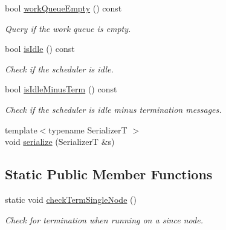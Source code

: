 \begin{DoxyCompactItemize}
bool \hyperlink{structvt_1_1sched_1_1_scheduler_a49bfd7d4a6d187c6c995b84885a1ed19}{work\+Queue\+Empty} () const
\begin{DoxyCompactList}\small\item\em Query if the work queue is empty. \end{DoxyCompactList}\item 
bool \hyperlink{structvt_1_1sched_1_1_scheduler_a047e7a211a220c2729c51c36271c7bf1}{is\+Idle} () const
\begin{DoxyCompactList}\small\item\em Check if the scheduler is idle. \end{DoxyCompactList}\item 
bool \hyperlink{structvt_1_1sched_1_1_scheduler_a3229e007ac15bfb1d337428a52157817}{is\+Idle\+Minus\+Term} () const
\begin{DoxyCompactList}\small\item\em Check if the scheduler is idle minus termination messages. \end{DoxyCompactList}\item 
{\footnotesize template$<$typename SerializerT $>$ }\\void \hyperlink{structvt_1_1sched_1_1_scheduler_ac4221da465bbe5d3acaa56c8c099ef7b}{serialize} (SerializerT \&s)
\end{DoxyCompactItemize}
\subsection*{Static Public Member Functions}
\begin{DoxyCompactItemize}
\item 
static void \hyperlink{structvt_1_1sched_1_1_scheduler_ad1b05fb0d94a3e707d7733ef5206b7c8}{check\+Term\+Single\+Node} ()
\begin{DoxyCompactList}\small\item\em Check for termination when running on a since node. \end{DoxyCompactList}\end{DoxyCompactItemize}

